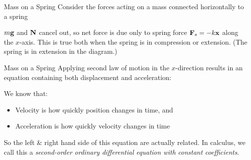\documentclass[12pt,compress,aspectratio=169]{beamer}
\newcommand{\mb}[1]{\ensuremath\mathbf{#1}}
\newcommand{\eq}[2]{\vspace{#1}{\Large\begin{displaymath}#2\end{displaymath}}}
\begin{document}
\begin{frame}{Mass on a Spring}
  Consider the forces acting on a mass connected horizontally to a spring

  \begin{center}
  \end{center}

  \vspace{-.1in}$m\mb{g}$ and $\mb{N}$ cancel out, so net force is due only to
  spring force $\mb{F}_s=-k\mb{x}$ along the $x$-axis. This is true both when
  the spring is in compression or extension. (The spring is in extension in the
  diagram.)
\end{frame}



\begin{frame}{Mass on a Spring}
  Applying second law of motion in the $x$-direction results in an equation
  containing both displacement and acceleration:

  \eq{-.2in}{
    \sum F=F_s=ma\quad\rightarrow\quad-\frac{k}{m}x=a
  }

  We know that:
  \begin{itemize}
  \item Velocity is how quickly position changes in time, and
  \item Acceleration is how quickly velocity changes in time
  \end{itemize}
  So the left \& right hand side of this equation are actually related. In
  calculus, we call this a
  \emph{second-order ordinary differential equation with constant coefficients}.
\end{frame}
\end{document}
